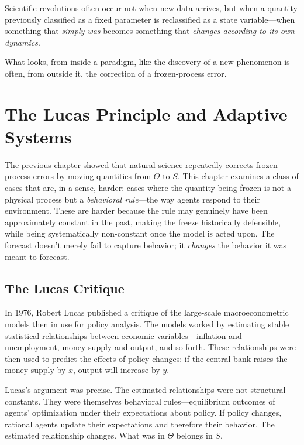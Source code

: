 \documentclass[11pt]{book}
\theoremstyle{plain}
\theoremstyle{definition}
\theoremstyle{remark}
\begin{document}
\begin{tcolorbox}[title={The Historical Principle}]
Scientific revolutions often occur not when new data arrives, but when a quantity previously classified as a fixed parameter is reclassified as a state variable---when something that \emph{simply was} becomes something that \emph{changes according to its own dynamics}.
\end{tcolorbox}

What looks, from inside a paradigm, like the discovery of a new phenomenon is often, from outside it, the correction of a frozen-process error.

\chapter{The Lucas Principle and Adaptive Systems}
\label{ch:lucas}

The previous chapter showed that natural science repeatedly corrects frozen-process errors by moving quantities from $\Theta$ to $S$. This chapter examines a class of cases that are, in a sense, harder: cases where the quantity being frozen is not a physical process but a \emph{behavioral rule}---the way agents respond to their environment. These are harder because the rule may genuinely have been approximately constant in the past, making the freeze historically defensible, while being systematically non-constant once the model is acted upon. The forecast doesn't merely fail to capture behavior; it \emph{changes} the behavior it was meant to forecast.

\section{The Lucas Critique}

In 1976, Robert Lucas published a critique of the large-scale macroeconometric models then in use for policy analysis. The models worked by estimating stable statistical relationships between economic variables---inflation and unemployment, money supply and output, and so forth. These relationships were then used to predict the effects of policy changes: if the central bank raises the money supply by $x$, output will increase by $y$.

Lucas's argument was precise. The estimated relationships were not structural constants. They were themselves behavioral rules---equilibrium outcomes of agents' optimization under their expectations about policy. If policy changes, rational agents update their expectations and therefore their behavior. The estimated relationship changes. What was in $\Theta$ belongs in $S$.
\end{document}
